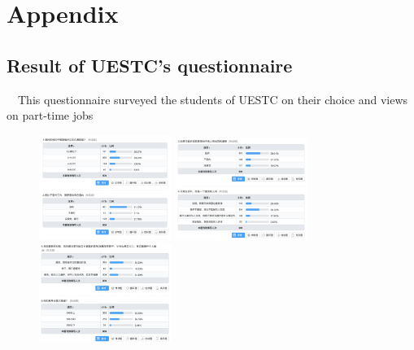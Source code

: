 \documentclass[12pt]{article}
\begin{document}
\section{Appendix}
\begin{appendix}
    \subsection{Result of UESTC's questionnaire}
    ~~This questionnaire surveyed the students of UESTC on their choice and views on part-time jobs
    \begin{figure}[htbp]
        \centering
        {
        \begin{minipage}[t]{0.3\linewidth}
        \centering
        \includegraphics[width=1.7in]{figure/pic1.png}
        \end{minipage}%
        }%
        {
        \begin{minipage}[t]{0.3\linewidth}
        \centering
        \includegraphics[width=1.7in]{figure/pic2.png}
        \end{minipage}%
        }%
        {
        \begin{minipage}[t]{0.3\linewidth}
        \centering
        \includegraphics[width=1.7in]{figure/pic3.png}
        \end{minipage}
}
\end{figure}
\end{appendix}
\end{document}
